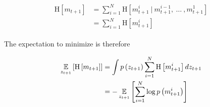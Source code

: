 \begin{align} \begin{split}
    \text{H}\left[
        m_{t+1}
    \right]
    &=
    \sum_{i=1}^{N}
    \text{H}\left[
        m_{t+1}^{i}
        \ \vert \
        m_{t+1}^{i-1}
        , \
        \dots
        \ ,
        m_{t+1}^{1}
    \right]
    \\
    &=
    \sum_{i=1}^{N}
    \text{H}\left[
        m_{t+1}^{i}
    \right]
\end{split} \end{align}

The expectation to minimize is therefore

\begin{align} \begin{split}
    \expect_{z_{t+1}}\left[
        \text{H}\left[
            m_{t+1}
        \right]
    \right]
    &=
    \int
    p\left(
        z_{t+1}
    \right)
    \sum_{i=1}^{N}
    \text{H}\left[
        m_{t+1}^{i}
    \right]
    dz_{t+1}
    \\
    &=
    -\expect_{z_{t+1}}\left[
        \sum_{i=1}^{N}
        \log p\left(
            m_{t+1}^{i}
        \right)
    \right]
\end{split} \end{align}

